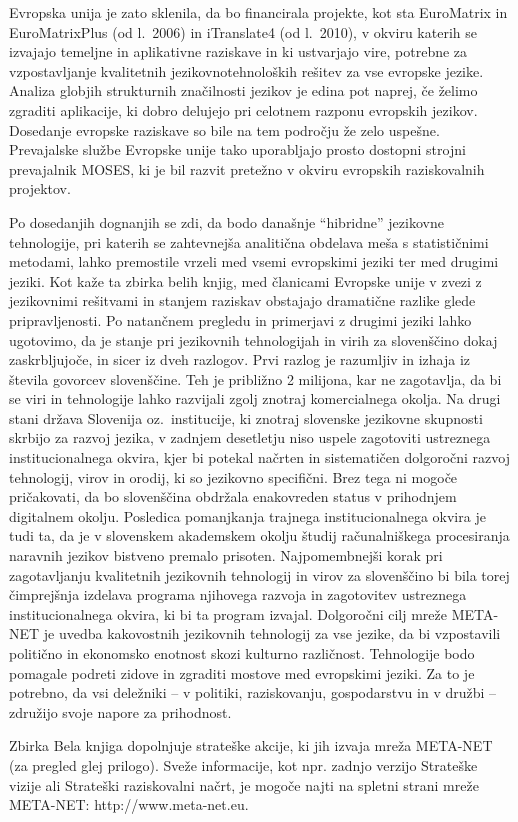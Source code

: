 \begin{multicols}{2}

Evropska unija je zato sklenila, da bo financirala projekte, kot sta EuroMatrix in EuroMatrixPlus (od l.~2006) in iTranslate4 (od l.~2010), v okviru katerih se izvajajo temeljne in aplikativne raziskave in ki ustvarjajo vire, potrebne za vzpostav\-ljanje kvalitetnih jezikovnotehnoloških rešitev za vse evropske jezike. Analiza globjih strukturnih značilnosti jezikov je edina pot naprej, če želimo zgraditi aplikacije, ki dobro delujejo pri celotnem razponu evropskih jezikov. Dosedanje evropske raziskave so bile na tem področju že zelo uspešne. Prevajalske službe Evropske unije tako uporab\-ljajo prosto dostopni stroj\-ni prevajalnik MOSES, ki je bil razvit pretežno v okviru evropskih raziskovalnih projektov.

Po dosedanjih dognanjih se zdi, da bodo današnje “hibridne” jezikovne tehnologije, pri katerih se zah\-tevnej\-ša analitična obdelava meša s statistič\-nimi metodami, lahko premostile vrzeli med vsemi evropskimi jeziki ter med drugimi jeziki. Kot kaže ta zbirka belih knjig, med članicami Evropske unije v zvezi z jezikovnimi rešitvami in stanjem raziskav obstajajo dramatične razlike glede priprav\-ljenosti. Po natančnem pregledu in primerjavi z drugimi jeziki lahko ugotovimo, da je stanje pri jezikovnih tehnologijah in virih za slovenščino dokaj zaskrb\-ljujoče, in sicer iz dveh razlogov. Prvi razlog je razumljiv in izhaja iz števila go\-vorcev slovenščine. Teh je približno 2 mili\-jona, kar ne zagotav\-lja, da bi se viri in tehnologije lahko razvijali zgolj znotraj komercialnega okolja. Na drugi stani država Slovenija oz.~institucije, ki znotraj slovenske jezikovne skupnosti skrbijo za razvoj jezika, v zadnjem desetletju niso uspele zagotoviti ustreznega institucionalnega okvira, kjer bi potekal načrten in sistema\-tičen dolgoročni razvoj tehnologij, virov in orodij, ki so jezikovno specifični. Brez tega ni mogoče pričakovati, da bo slovenščina obdržala enakovreden status v prihodnjem digitalnem okolju. Posledica pomanjkanja trajnega institucionalnega okvira je tudi ta, da je v slovenskem akademskem okolju študij računalniškega procesiranja naravnih jezikov bistveno premalo prisoten. Naj\-pomembnejši korak pri zagotav\-ljanju kvalitetnih jezikovnih tehnologij in virov za slovenščino bi bila torej čimprejšnja izdelava programa njihovega razvoja in zagotovitev ustreznega institucionalnega okvira, ki bi ta program izvajal. Dolgoročni cilj mreže META-NET je uvedba kakovostnih jezikovnih tehnologij za vse jezike, da bi vzpostavili politično in ekonomsko enotnost skozi kulturno različnost. Tehnologije bodo pomagale podreti zidove in zgraditi mostove med evropskimi jeziki. Za to je potrebno, da vsi deležniki – v politiki, raziskovanju, gospodarstvu in v družbi – združijo svoje napore za prihodnost.

Zbirka Bela knjiga dopolnjuje strateške akcije, ki jih izvaja mreža META-NET (za pregled glej pri\-logo). Sveže informacije, kot npr. zadnjo verzijo Strateške vizije \cite{Meta1} ali Strateški raziskovalni načrt, je mogoče naj\-ti na spletni strani mreže META-NET: http://www.meta-net.eu. 
\end{multicols}

